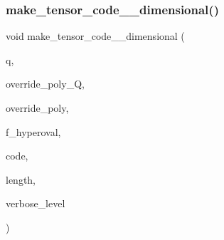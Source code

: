 \mbox{\label{tensor_8_c_ac1f62adbb468b75ca66a5e9f8c6c9b1b}} 
\subsubsection{\texorpdfstring{make\+\_\+tensor\+\_\+code\+\_\+\_\+dimensional()}{make\_tensor\_code\_9\_dimensional()}}
{\footnotesize\ttfamily void make\+\_\+tensor\+\_\+code\+\_\+\_\+dimensional (\begin{DoxyParamCaption}\item[{\mbox{\hyperlink{galois_8h_a09fddde158a3a20bd2dcadb609de11dc}{I\+NT}}}]{q,  }\item[{const \mbox{\hyperlink{galois_8h_ab6cc7b4aeb6ea31aba2b3fbfc83ff5e6}{B\+Y\+TE}} $\ast$}]{override\+\_\+poly\+\_\+Q,  }\item[{const \mbox{\hyperlink{galois_8h_ab6cc7b4aeb6ea31aba2b3fbfc83ff5e6}{B\+Y\+TE}} $\ast$}]{override\+\_\+poly,  }\item[{\mbox{\hyperlink{galois_8h_a09fddde158a3a20bd2dcadb609de11dc}{I\+NT}}}]{f\+\_\+hyperoval,  }\item[{\mbox{\hyperlink{galois_8h_a09fddde158a3a20bd2dcadb609de11dc}{I\+NT}} $\ast$\&}]{code,  }\item[{\mbox{\hyperlink{galois_8h_a09fddde158a3a20bd2dcadb609de11dc}{I\+NT}} \&}]{length,  }\item[{\mbox{\hyperlink{galois_8h_a09fddde158a3a20bd2dcadb609de11dc}{I\+NT}}}]{verbose\+\_\+level }\end{DoxyParamCaption})}

\mbox{\label{tensor_8_c_aaf423a41c900e47945414385a1f90511}} 
